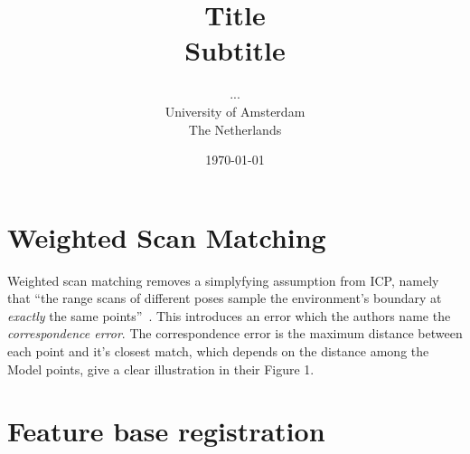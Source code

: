 \documentclass[a4paper]{article}
\title{Title\\
{\large Subtitle}}
\author{...\\
  University of Amsterdam\\
  The Netherlands}
\date{\today}
\begin{document}
\maketitle

\section{Weighted Scan Matching}

Weighted scan matching removes a simplyfying assumption from ICP, namely that ``the range scans of different poses sample the environment's boundary at \emph{exactly} the same points''~\cite{pfister2002weighted}. This introduces an error which the authors name the \emph{correspondence error}. The correspondence error is the maximum distance between each point and it's closest match, which depends on the distance among the Model points, \cite{slamet2008boosting} give a clear illustration in their Figure 1.


\section{Feature base registration}



{}

\end{document}
